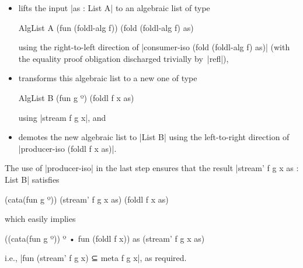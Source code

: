 \begin{itemize}
\item lifts the input |as : List A| to an algebraic list of type
\begin{code}
AlgList A (fun (foldl-alg f)) (fold (foldl-alg f) as)
\end{code}
using the right-to-left direction of |consumer-iso (fold (foldl-alg f) as)| (with the equality proof obligation discharged trivially by~|refl|),
\item transforms this algebraic list to a new one of type
\begin{code}
AlgList B (fun g º) (foldl f x as)
\end{code}
using |stream f g x|, and
\item demotes the new algebraic list to |List B| using the left-to-right direction of |producer-iso (foldl f x as)|.
\end{itemize}
The use of |producer-iso| in the last step ensures that the result |stream' f g x as : List B| satisfies
\begin{code}
(cata(fun g º)) (stream' f g x as) (foldl f x as)
\end{code}
which easily implies
\begin{code}
((cata(fun g º)) º • fun (foldl f x)) as (stream' f g x as)
\end{code}
i.e., |fun (stream' f g x) ⊆ meta f g x|, as required.

